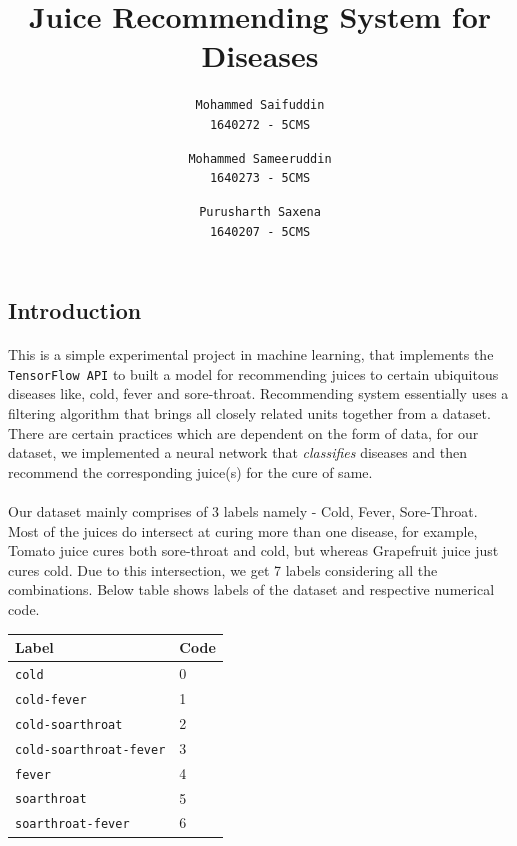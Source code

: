 \documentclass[letterpaper, 11pt]{article}
\begin{document}
\title{Juice Recommending System for Diseases}
\author{
	\texttt{Mohammed Saifuddin}\\
	\texttt{1640272 - 5CMS}
	\and
	\texttt{Mohammed Sameeruddin}\\
	\texttt{1640273 - 5CMS}
	\and
	\texttt{Purusharth Saxena}\\
	\texttt{1640207 - 5CMS}
}
\date{}
\maketitle
\subsection*{Introduction}
\paragraph{} This is a simple experimental project in machine learning, that implements the \texttt{TensorFlow API} to built a model for recommending juices to certain ubiquitous diseases like, cold, fever and sore-throat.
Recommending system essentially uses a filtering algorithm that brings all closely related units together from a dataset. There are certain practices which are dependent on the form of data, for our dataset, we implemented a neural network that \textit{classifies} diseases and then recommend the corresponding juice(s) for the cure of same.
\paragraph{} Our dataset mainly comprises of 3 labels namely - Cold, Fever, Sore-Throat. Most of the juices do intersect at curing more than one disease, for example, Tomato juice cures both sore-throat and cold, but whereas Grapefruit juice just cures cold. Due to this intersection, we get 7 labels considering all the combinations. Below table shows labels of the dataset and respective numerical code.
\begin{center}
\setlength{\tabcolsep}{0.6em}
{\renewcommand{\arraystretch}{1.4}
\begin{tabular}{|p{5cm}||p{2cm}|}
\hline
\textbf{Label} & \textbf{Code}\\
\hline
\texttt{cold} & 0\\
\hline
\texttt{cold-fever} & 1\\
\hline
\texttt{cold-soarthroat} & 2\\
\hline
\texttt{cold-soarthroat-fever} & 3\\
\hline
\texttt{fever} & 4\\
\hline
\texttt{soarthroat} & 5\\
\hline
\texttt{soarthroat-fever} & 6\\
\hline
\end{tabular}
}
\end{center}
\end{document}

